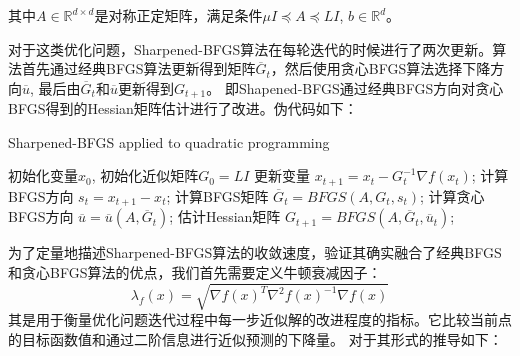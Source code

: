 \documentclass[a4paper,twoside,AutoFakeBold]{article}
\theoremstyle{definition}
\begin{document}
其中$A\in\mathbb{R}^{d\times d}$是对称正定矩阵，满足条件$\mu I\preceq A\preceq LI$, $b\in\mathbb{R}^d$。

对于这类优化问题，Sharpened-BFGS算法在每轮迭代的时候进行了两次更新。算法首先通过经典BFGS算法更新得到矩阵$\overline{G}_t$，然后使用贪心BFGS算法选择下降方向$\overline{u}$, 最后由$\overline{G}_t$和$\overline{u}$更新得到$G_{t+1}$。
即Shapened-BFGS通过经典BFGS方向对贪心BFGS得到的Hessian矩阵估计进行了改进。伪代码如下：

\begin{algorithm}[H]\xiaosi
    \caption{\xiaosi Sharpened-BFGS applied to quadratic programming}
    \begin{algorithmic}
        \REQUIRE 初始化变量$x_0$, 初始化近似矩阵$G_0=LI$
            \STATE 更新变量 $x_{t+1}=x_t-G_t^{-1}\nabla f(x_t)$;
            \STATE 计算BFGS方向 $s_t=x_{t+1}-x_t$;
            \STATE 计算BFGS矩阵 $\overline{G}_t=BFGS(A,G_t,s_t)$;
            \STATE 计算贪心BFGS方向 $\overline{u}=\overline{u} (A,\overline{G}_t)$;
            \STATE 估计Hessian矩阵 $G_{t+1}=BFGS(A,\overline{G}_t,\overline{u}_t)$;
        \ENDFOR
    \end{algorithmic}
\end{algorithm}

为了定量地描述Sharpened-BFGS算法的收敛速度，验证其确实融合了经典BFGS和贪心BFGS算法的优点，我们首先需要定义牛顿衰减因子：
\begin{equation}
    \lambda_f (x)=\sqrt{\nabla f(x)^T\nabla ^2 f(x)^{-1}\nabla f(x)}
\end{equation}
其是用于衡量优化问题迭代过程中每一步近似解的改进程度的指标。它比较当前点的目标函数值和通过二阶信息进行近似预测的下降量。
对于其形式的推导如下：
\end{document}
